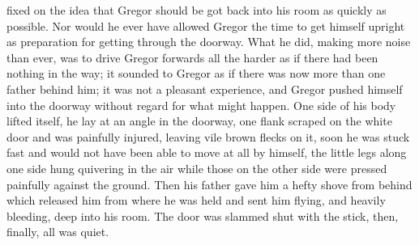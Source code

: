 fixed on the idea that Gregor should be got back into his room as quickly as possible. Nor would he ever have allowed Gregor the time to get himself upright as preparation for getting through the doorway. What he did, making more noise than ever, was to drive Gregor forwards all the harder as if there had been nothing in the way; it sounded to Gregor as if there was now more than one father behind him; it was not a pleasant experience, and Gregor pushed himself into the doorway without regard for what might happen. One side of his body lifted itself, he lay at an angle in the doorway, one flank scraped on the white door and was painfully injured, leaving vile brown flecks on it, soon he was stuck fast and would not have been able to move at all by himself, the little legs along one side hung quivering in the air while those on the other side were pressed painfully against the ground. Then his father gave him a hefty shove from behind which released him from where he was held and sent him flying, and heavily bleeding, deep into his room. The door was slammed shut with the stick, then, finally, all was quiet.
